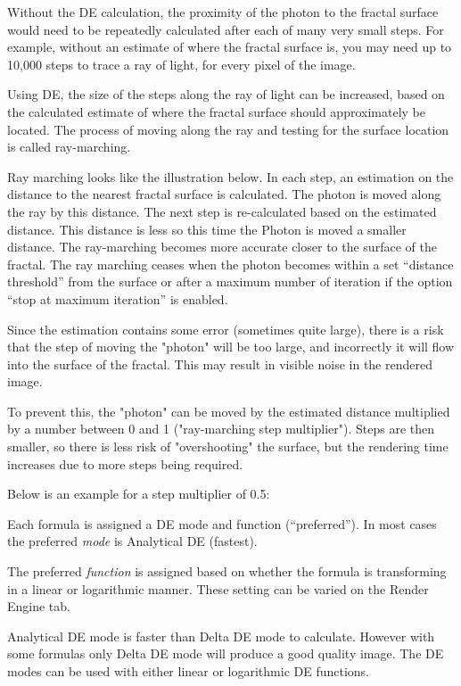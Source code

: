 Without the DE calculation, the proximity of the photon to the fractal
surface would need to be repeatedly calculated after each of many very
small steps. For example, without an estimate of where the fractal
surface is, you may need up to 10,000 steps to trace a ray of light, for
every pixel of the image.

Using DE, the size of the steps along the ray of light can be increased,
based on the calculated estimate of where the fractal surface should
approximately be located. The process of moving along the ray and
testing for the surface location is called ray-marching.

Ray marching looks like the illustration below. In each step, an
estimation on the distance to the nearest fractal surface is calculated.
The photon is moved along the ray by this distance. The next step is
re-calculated based on the estimated distance. This distance is less so
this time the Photon is moved a smaller distance. The ray-marching
becomes more accurate closer to the surface of the fractal. The ray
marching ceases when the photon becomes within a set ``distance
threshold'' from the surface or after a maximum number of iteration if
the option ``stop at maximum iteration'' is enabled.

Since the estimation contains some error (sometimes quite large), there
is a risk that the step of moving the "photon" will be too large, and
incorrectly it will flow into the surface of the fractal. This may
result in visible noise in the rendered image.

To prevent this, the "photon" can be moved by the estimated distance
multiplied by a number between 0 and 1 ("ray-marching step multiplier").
Steps are then smaller, so there is less risk of "overshooting" the
surface, but the rendering time increases due to more steps being
required.

Below is an example for a step multiplier of 0.5:

Each formula is assigned a DE mode and function (``preferred''). In most
cases the preferred \emph{mode} is Analytical DE (fastest).

The preferred \emph{function} is assigned based on whether the formula
is transforming in a linear or logarithmic manner. These setting can be
varied on the Render Engine tab.

Analytical DE mode is faster than Delta DE mode to calculate. However
with some formulas only Delta DE mode will produce a good quality image.
The DE modes can be used with either linear or logarithmic DE functions.

